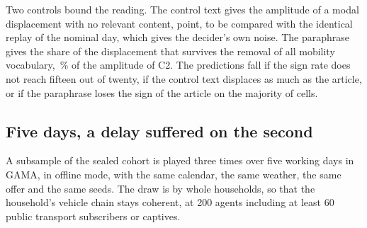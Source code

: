 Two controls bound the reading. The control text gives the amplitude of a modal displacement with no relevant content,  point, to be compared with the identical replay of the nominal day, which gives the decider's own noise. The paraphrase gives the share of the displacement that survives the removal of all mobility vocabulary, \,\% of the amplitude of C2. The predictions fall if the sign rate does not reach fifteen out of twenty, if the control text displaces as much as the article, or if the paraphrase loses the sign of the article on the majority of cells.

%

\subsection{Five days, a delay suffered on the second}
\label{sec:hysteresis}

A subsample of the sealed cohort is played three times over five working days in GAMA, in offline mode, with the same calendar, the same weather, the same offer and the same seeds. The draw is by whole households, so that the household's vehicle chain stays coherent, at 200 agents including at least 60 public transport subscribers or captives.

